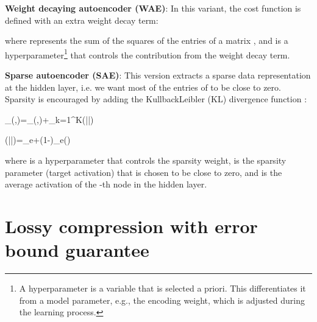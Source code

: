 \documentclass[a4paper,onecolumn,conference]{IEEEtran}
\begin{document}
\textbf{Weight decaying autoencoder (WAE)}: In this variant, the cost function is defined with an extra weight decay term:

where  represents the sum of the squares of the entries of a matrix , and  is a hyperparameter\footnote{A hyperparameter is a variable that is selected a priori. This differentiates
it from a model parameter, e.g., the encoding weight, which is adjusted during the learning process.} 
that controls the contribution from the weight decay term.

\textbf{Sparse autoencoder (SAE)}: This version extracts a sparse data representation at the hidden layer, i.e. we want most of the entries of  to be close to zero. Sparsity is encouraged by adding the Kullback\textendash{}Leibler (KL) divergence function \cite{ng2011sparse}:

\Gamma_{}\left(\boldsymbol{\theta},\right)=\Gamma_{}\left(\boldsymbol{\theta},\right)+\eta\sum_{k=1}^{K}(\rho||)

(\rho||)=\rho\log_{e}+\left(1-\rho\right)\log_{e}\left(\right)

where  is a hyperparameter that controls the sparsity weight,  is the sparsity parameter (target activation) that is chosen to be close to zero, and  is the average activation of the -th node in the hidden layer.

\vspace{-2mm}
\section{Lossy compression with error bound guarantee}\label{sec:framework}
\end{document}
